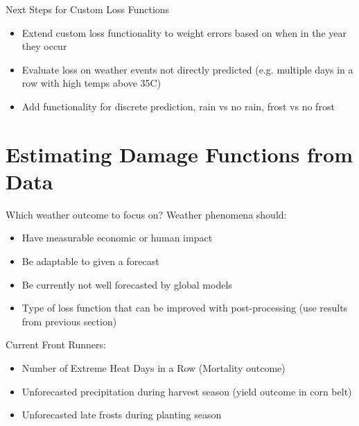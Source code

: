 \documentclass[aspectratio=169, xcolor=dvipsnames]{beamer}
\begin{document}
\begin{frame}{Next Steps for Custom Loss Functions}
    \begin{itemize}
        \item Extend custom loss functionality to weight errors based on when in the year they occur
        \item Evaluate loss on weather events not directly predicted (e.g. multiple days in a row with high temps above 35C)
        \item Add functionality for discrete prediction, rain vs no rain, frost vs no frost
    \end{itemize}
\end{frame}

\section{Estimating Damage Functions from Data}

\begin{frame}{Which weather outcome to focus on?}
    Weather phenomena should:
    \begin{itemize}
        \item Have measurable economic or human impact
        \item Be adaptable to given a forecast
        \item Be currently not well forecasted by global models
        \item Type of loss function that can be improved with post-processing (use results from previous section)
    \end{itemize}
    Current Front Runners:
    \begin{itemize}
        \item Number of Extreme Heat Days in a Row (Mortality outcome)
        \item Unforecasted precipitation during harvest season (yield outcome in corn belt) 
        \item Unforecasted late frosts during planting season
    \end{itemize}
\end{frame}
\end{document}
